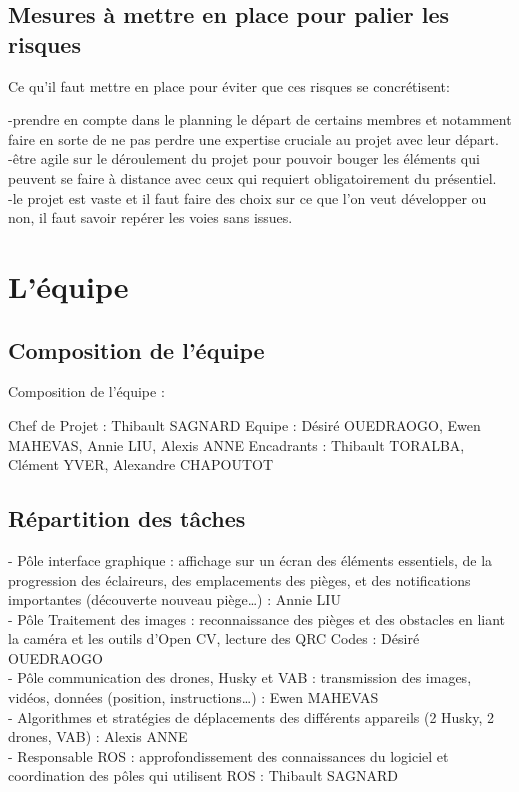 \documentclass[11pt]{article}
\begin{document}
\subsection{Mesures à mettre en place pour palier les risques}

Ce qu’il faut mettre en place pour éviter que ces risques se concrétisent:

-prendre en compte dans le planning le départ de certains membres et notamment faire en sorte de ne pas perdre une expertise cruciale au projet avec leur départ. \\
-être agile sur le déroulement du projet pour pouvoir bouger les éléments qui peuvent se faire à distance avec ceux qui requiert obligatoirement du présentiel. \\
-le projet est vaste et il faut faire des choix sur ce que l’on veut développer ou non, il faut savoir repérer les voies sans issues. \\


\section{L'équipe}


\subsection{Composition de l'équipe}
Composition de l’équipe :

Chef de Projet : Thibault SAGNARD
Equipe : Désiré OUEDRAOGO, Ewen MAHEVAS, Annie LIU, Alexis ANNE
Encadrants : Thibault TORALBA, Clément YVER, Alexandre CHAPOUTOT

\subsection{Répartition des tâches}

-    Pôle interface graphique : affichage sur un écran des éléments essentiels, de la progression des éclaireurs, des emplacements des pièges, et des notifications importantes (découverte nouveau piège…) : Annie LIU \\
-    Pôle Traitement des images : reconnaissance des pièges et des obstacles en liant la caméra et les outils d’Open CV, lecture des QRC Codes : Désiré OUEDRAOGO \\
-    Pôle communication des drones, Husky et VAB : transmission des images, vidéos, données (position, instructions…) : Ewen MAHEVAS \\
-    Algorithmes et stratégies de déplacements des différents appareils (2 Husky, 2 drones, VAB) : Alexis ANNE \\
-    Responsable ROS : approfondissement des connaissances du logiciel et coordination des pôles qui utilisent ROS : Thibault SAGNARD \\
\end{document}
